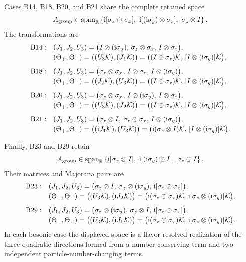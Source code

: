 Cases B14, B18, B20, and B21 share the complete retained space
\begin{equation*}
 A_{\rm group}\in\operatorname{span}_{\mathbb R}
 \left\{
 \ii[\sigma_x\otimes\sigma_x],\ 
 \ii[(\ii\sigma_y)\otimes\sigma_x],\ 
 \sigma_z\otimes I
 \right\}.
\end{equation*}
The transformations are
\begin{align*}
\mathrm{B14}:\quad
 &(J_1,J_2,U_3)=
 \bigl(I\otimes(\mathrm{i}\sigma_y),\,
 \sigma_z\otimes\sigma_x,\,I\otimes\sigma_z\bigr),\\[-2pt]
 &(\Theta_+,\Theta_-)=
 \bigl((U_3\mathcal{K}),(J_1\mathcal{K})\bigr)
 =\bigl((I\otimes\sigma_z)\mathcal{K},\,
 [I\otimes(\mathrm{i}\sigma_y)]\mathcal{K}\bigr),\\[4pt]
\mathrm{B18}:\quad
 &(J_1,J_2,U_3)=
 \bigl(\sigma_z\otimes\sigma_x,\,I\otimes\sigma_z,\,
 I\otimes(\mathrm{i}\sigma_y)\bigr),\\[-2pt]
 &(\Theta_+,\Theta_-)=
 \bigl((J_2\mathcal{K}),(U_3\mathcal{K})\bigr)
 =\bigl((I\otimes\sigma_z)\mathcal{K},\,
 [I\otimes(\mathrm{i}\sigma_y)]\mathcal{K}\bigr),\\[4pt]
\mathrm{B20}:\quad
 &(J_1,J_2,U_3)=
 \bigl(\sigma_z\otimes\sigma_x,\,
 I\otimes(\mathrm{i}\sigma_y),\,I\otimes\sigma_z\bigr),\\[-2pt]
 &(\Theta_+,\Theta_-)=
 \bigl((U_3\mathcal{K}),(J_2\mathcal{K})\bigr)
 =\bigl((I\otimes\sigma_z)\mathcal{K},\,
 [I\otimes(\mathrm{i}\sigma_y)]\mathcal{K}\bigr),\\[4pt]
\mathrm{B21}:\quad
 &(J_1,J_2,U_3)=
 \bigl(\sigma_z\otimes I,\,\sigma_z\otimes\sigma_x,\,
 I\otimes(\mathrm{i}\sigma_y)\bigr),\\[-2pt]
 &(\Theta_+,\Theta_-)=
 \bigl((\mathrm{i} J_1\mathcal{K}),(U_3\mathcal{K})\bigr)
 =\bigl(\mathrm{i}(\sigma_z\otimes I)\mathcal{K},\,
 [I\otimes(\mathrm{i}\sigma_y)]\mathcal{K}\bigr).
\end{align*}

Finally, B23 and B29 retain
\begin{equation*}
 A_{\rm group}\in\operatorname{span}_{\mathbb R}
 \left\{
 \ii[\sigma_x\otimes I],\ 
 \ii[(\ii\sigma_y)\otimes I],\ 
 \sigma_z\otimes I
 \right\}.
\end{equation*}
Their matrices and Majorana pairs are
\begin{align*}
\mathrm{B23}:\quad
 &(J_1,J_2,U_3)=
 \bigl(\sigma_z\otimes I,\,
 \sigma_z\otimes(\mathrm{i}\sigma_y),\,
 \mathrm{i}[\sigma_z\otimes\sigma_x]\bigr),\\[-2pt]
 &(\Theta_+,\Theta_-)=
 \bigl((U_3\mathcal{K}),(\mathrm{i} J_2\mathcal{K})\bigr)
 =\bigl(\mathrm{i}(\sigma_z\otimes\sigma_x)\mathcal{K},\,
 \mathrm{i}[\sigma_z\otimes(\mathrm{i}\sigma_y)]\mathcal{K}\bigr),\\[4pt]
\mathrm{B29}:\quad
 &(J_1,J_2,U_3)=
 \bigl(\sigma_z\otimes(\mathrm{i}\sigma_y),\,
 \sigma_z\otimes I,\,
 \mathrm{i}[\sigma_z\otimes\sigma_x]\bigr),\\[-2pt]
 &(\Theta_+,\Theta_-)=
 \bigl((U_3\mathcal{K}),(\mathrm{i} J_1\mathcal{K})\bigr)
 =\bigl(\mathrm{i}(\sigma_z\otimes\sigma_x)\mathcal{K},\,
 \mathrm{i}[\sigma_z\otimes(\mathrm{i}\sigma_y)]\mathcal{K}\bigr).
\end{align*}
In each bosonic case the displayed space is a flavor-resolved realization of
the three quadratic directions
formed from a number-conserving term and two independent
particle-number-changing terms.

